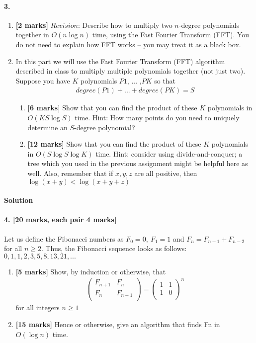 \documentclass[a4paper]{scrartcl}
\begin{document}
\paragraph{3.}
\label{sec:Question 3}
\begin{enumerate}[label=(\alph*)]
\item {\bfseries[2 marks]} $Revision$: Describe how to multiply two $n$-degree polynomials together in $O(n\log{n})$ time, using the Fast Fourier Transform (FFT). You do not need to explain how FFT works – you may treat it as a black box.
\item In this part we will use the Fast Fourier Transform (FFT) algorithm described in class to multiply multiple polynomials together (not just two). Suppose you have $K$ polynomials $P1$, ... ,$PK$ so that
\begin{align*}
  degree(P1 ) + ...  + degree(PK ) = S
\end{align*}
\begin{enumerate}[label=(\roman*)]
  \item {\bfseries[6 marks]} Show that you can find the product of these $K$ polynomials in $O(KS\log{S})$ time.
  Hint: How many points do you need to uniquely determine an $S$-degree polynomial?
  \item {\bfseries[12 marks]} Show that you can find the product of these $K$ polynomials in $O(S\log{S}\log{K})$ time.
  Hint: consider using divide-and-conquer; a tree which you used in the previous assignment might be helpful here as well. Also, remember that if $x,y,z$ are all positive, then $\log{(x + y)} < \log{(x + y + z)}$
\end{enumerate}
\end{enumerate}

\paragraph{Solution}

\paragraph{4. [20 marks, each pair 4 marks]}
\label{sec:Question 4}
Let us define the Fibonacci numbers as $F_0=0,\ F_1=1$ and $F_n=F_{n-1}+F_{n-2}$ for all $n\geq2$. Thus, the Fibonacci sequence looks as follows: $0, 1, 1, 2, 3, 5, 8, 13, 21, . . .$
\begin{enumerate}[label=(\alph*)]
  \item{\bfseries[5 marks]} Show, by induction or otherwise, that
\begin{align*}
  \begin{pmatrix}
   F_{n+1} & F_n \\
   F_n & F_{n-1} \\
  \end{pmatrix}
  =
  \begin{pmatrix}
    1 & 1 \\
    1 & 0 \\
  \end{pmatrix}^{\!n}
\end{align*}
  for all integers $n\geq1$
  \item {\bfseries[15 marks]} Hence or otherwise, give an algorithm that finds Fn in $O(\log{n})$ time.
\end{enumerate}
\end{document}
